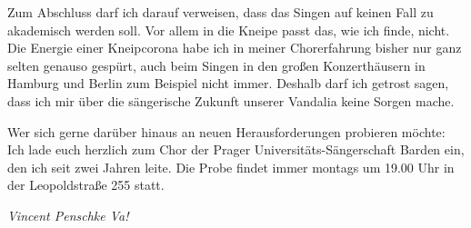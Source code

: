 \begin{multicols}{2}
	Zum Abschluss darf ich darauf verweisen, dass das Singen auf keinen Fall zu akademisch werden soll. Vor allem in die Kneipe passt das, wie ich finde, nicht. Die Energie einer Kneipcorona habe ich in meiner Chorerfahrung bisher nur ganz selten genauso gespürt, auch beim Singen in den großen Konzerthäusern in Hamburg und Berlin zum Beispiel nicht immer.
	Deshalb darf ich getrost sagen, dass ich mir über die sängerische Zukunft unserer Vandalia keine Sorgen mache. 
	
	Wer sich gerne darüber hinaus an neuen Herausforderungen probieren möchte: Ich lade euch herzlich zum Chor der Prager Universitäts-Sängerschaft Barden ein, den ich seit zwei Jahren leite. Die Probe findet immer montags um 19.00 Uhr in der Leopoldstraße 255 statt.
	
	\begin{flushright}
		\hfill\emph{Vincent Penschke Va! }
	\end{flushright}
\end{multicols}
%
